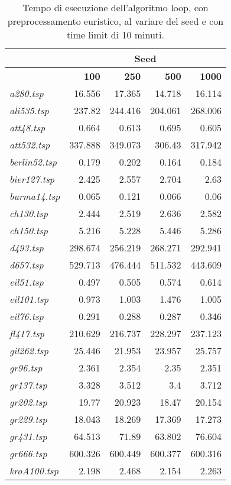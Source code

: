 {\footnotesize
\begin{longtable}[H]{lrrrr}
\caption{Tempo di esecuzione dell'algoritmo loop, con preprocessamento euristico, al variare del seed e con time limit di 10 minuti.}\\
\cline{2-5}
{} & \multicolumn{4}{c}{\textbf{Seed}}\\
\hline
{} & \textbf{100} & \textbf{250} & \textbf{500} & \textbf{1000}\\
\hline
\textit{a280.tsp} & 16.556 & 17.365 & 14.718 & 16.114\\
\textit{ali535.tsp} & 237.82 & 244.416 & 204.061 & 268.006\\
\textit{att48.tsp} & 0.664 & 0.613 & 0.695 & 0.605\\
\textit{att532.tsp} & 337.888 & 349.073 & 306.43 & 317.942\\
\textit{berlin52.tsp} & 0.179 & 0.202 & 0.164 & 0.184\\
\textit{bier127.tsp} & 2.425 & 2.557 & 2.704 & 2.63\\
\textit{burma14.tsp} & 0.065 & 0.121 & 0.066 & 0.06\\
\textit{ch130.tsp} & 2.444 & 2.519 & 2.636 & 2.582\\
\textit{ch150.tsp} & 5.216 & 5.228 & 5.446 & 5.286\\
\textit{d493.tsp} & 298.674 & 256.219 & 268.271 & 292.941\\
\textit{d657.tsp} & 529.713 & 476.444 & 511.532 & 443.609\\
\textit{eil51.tsp} & 0.497 & 0.505 & 0.574 & 0.614\\
\textit{eil101.tsp} & 0.973 & 1.003 & 1.476 & 1.005\\
\textit{eil76.tsp} & 0.291 & 0.288 & 0.287 & 0.346\\
\textit{fl417.tsp} & 210.629 & 216.737 & 228.297 & 237.123\\
\textit{gil262.tsp} & 25.446 & 21.953 & 23.957 & 25.757\\
\textit{gr96.tsp} & 2.361 & 2.354 & 2.35 & 2.351\\
\textit{gr137.tsp} & 3.328 & 3.512 & 3.4 & 3.712\\
\textit{gr202.tsp} & 19.77 & 20.923 & 18.47 & 20.154\\
\textit{gr229.tsp} & 18.043 & 18.269 & 17.369 & 17.273\\
\textit{gr431.tsp} & 64.513 & 71.89 & 63.802 & 76.604\\
\textit{gr666.tsp} & 600.326 & 600.449 & 600.377 & 600.316\\
\textit{kroA100.tsp} & 2.198 & 2.468 & 2.154 & 2.263\\

\end{longtable}}
